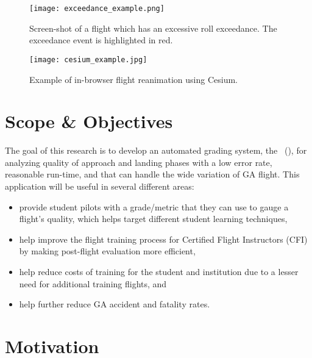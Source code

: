 	\begin{figure}
    	\centering
        \texttt{[image: exceedance\_example.png]}
        \caption{Screen-shot of a flight which has an excessive roll exceedance.  The exceedance event is highlighted in red.}
        \label{fig:exceedance_example}
    \end{figure}
    
    \begin{figure}
    	\centering
        \texttt{[image: cesium\_example.jpg]}
        \caption{Example of in-browser flight reanimation using Cesium.}
        \label{fig:cesium_example}
    \end{figure}


\section{Scope \& Objectives} \label{sec:objectives}

	The goal of this research is to develop an automated grading system, the \toolname\ (\toolnameshort), for analyzing quality of approach and landing phases with a low error rate, reasonable run-time, and that can handle the wide variation of GA flight.  This application will be useful in several different areas:
%
    \begin{itemize}
    	\item provide student pilots with a grade/metric that they can use to gauge a flight's quality, which helps target different student learning techniques,
        \item help improve the flight training process for Certified Flight Instructors (CFI) by making post-flight evaluation more efficient,
        \item help reduce costs of training for the student and institution due to a lesser need for additional training flights, and
        \item help further reduce GA accident and fatality rates.
    \end{itemize}
    

\section{Motivation} \label{sec:motivation}

